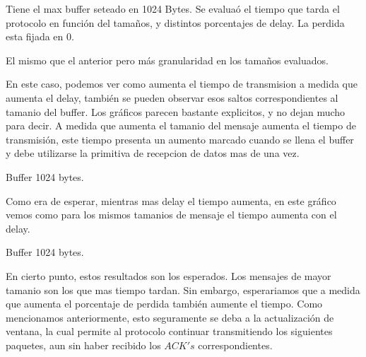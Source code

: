 Tiene el max buffer seteado en 1024 Bytes. Se evalua\'o el tiempo que tarda el protocolo en funci\'on del tama\~nos, y distintos porcentajes de delay. La perdida esta fijada en 0. 

El mismo que el anterior pero m\'as granularidad en los tama\~nos evaluados.

En este caso, podemos ver como aumenta el tiempo de transmision a medida que aumenta el delay, tambi\'en se pueden observar  esos saltos correspondientes al tamanio del buffer. Los gr\'aficos parecen bastante explicitos, y no dejan mucho para decir. A medida que aumenta el tamanio del mensaje aumenta el tiempo de transmisi\'on, este tiempo presenta un aumento marcado cuando se llena el buffer y debe utilizarse la primitiva de recepcion de datos mas de una vez.


Buffer 1024 bytes. 

Como era de esperar, mientras mas delay el tiempo aumenta, en este gr\'afico vemos como para los mismos tamanios de mensaje el tiempo aumenta con el delay. 


Buffer 1024 bytes.

En cierto punto, estos resultados son los esperados. Los mensajes de mayor tamanio son los que mas tiempo tardan. Sin embargo, esperariamos que a medida que aumenta el porcentaje de perdida tambi\'en aumente el tiempo.
Como mencionamos anteriormente, esto seguramente se deba a la actualizaci\'on de ventana, la cual permite al protocolo continuar transmitiendo los siguientes paquetes, aun sin haber recibido los $ACK's$ correspondientes.